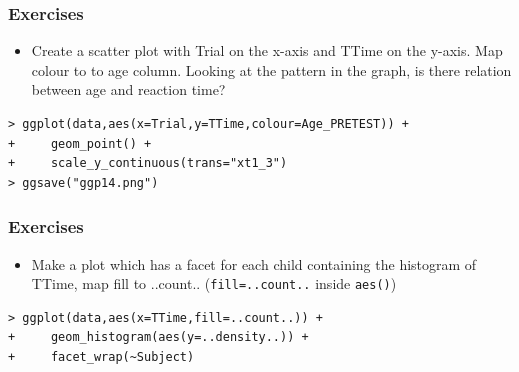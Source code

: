 \documentclass[xcolor={table},c]{beamer}
\begin{document}
\begin{frame}[fragile]\frametitle{Exercises}
  \begin{itemize}
  \item Create a scatter plot with Trial on the x-axis and TTime on the y-axis. Map colour to to age column. Looking at the pattern in the graph, is there relation between age and reaction time?
  \end{itemize}
\begin{verbatim}
> ggplot(data,aes(x=Trial,y=TTime,colour=Age_PRETEST)) +
+     geom_point() +
+     scale_y_continuous(trans="xt1_3") 
> ggsave("ggp14.png")
\end{verbatim}
\begin{center}
\end{center}
\end{frame}


\begin{frame}[fragile]\frametitle{Exercises}
  \begin{itemize}
  \item Make a plot which has a facet for each child containing the histogram of TTime, map fill to ..count.. (\texttt{fill=..count..} inside  \texttt{aes()}) 
  \end{itemize}
\begin{verbatim}
> ggplot(data,aes(x=TTime,fill=..count..)) +
+     geom_histogram(aes(y=..density..)) +
+     facet_wrap(~Subject) 
\end{verbatim}
\begin{center}
\end{center}
\end{frame}
\end{document}
